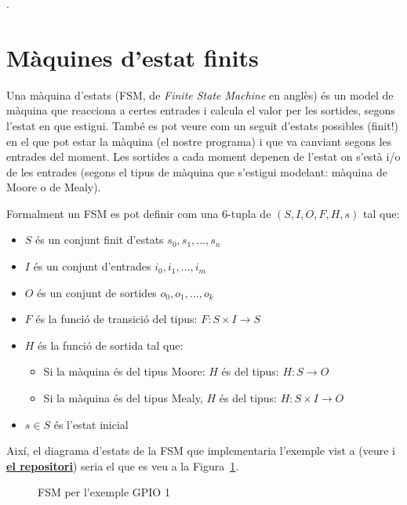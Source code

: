 .

\section{Màquines d'estat finits}
\label{sec:FSM}

Una màquina d'estats (\gls{FSM}, de {\em Finite State Machine} en anglès) és un model de màquina que reacciona a certes entrades i calcula el valor per les sortides, segons l'estat en que estigui. També es pot veure com un seguit d'estats possibles (finit!) en el que pot estar la màquina (el nostre programa) i que va canviant segons les entrades del moment. Les sortides a cada moment depenen de l'estat on s'està i/o de les entrades (segons el tipus de màquina que s'estigui modelant: màquina de Moore o de Mealy).\cite{wiki:FSM}

\begin{remark}
 Formalment un FSM es pot definir com una 6-tupla de $(S, I, O, F, H, s)$ tal que:
\begin{itemize}
 \item $S$ és un conjunt finit d'estats ${s_0,s_1, ..., s_n}$
 \item $I$ és un conjunt d'entrades ${i_0, i_1, ..., i_m}$
 \item $O$ és un conjunt de sortides ${o_0, o_1, ..., o_k}$
 \item $F$ és la funció de transició del tipus: $F: S \times I \to S$
 \item $H$ és la funció de sortida tal que:
 \begin{itemize}
  \item Si la màquina és del tipus Moore: $H$ és del tipus: $H: S \to O$
  \item Si la màquina és del tipus Mealy, $H$ és del tipus: $H: S \times I \to O$ 
 \end{itemize}
 \item $s \in S$ és l'estat inicial 
\end{itemize}
\end{remark}

Així, el diagrama d'estats de la FSM que implementaria l'exemple vist a (veure  i \href{https://github.com/mariusmm/cursembedded/tree/master/Simplicity/GPIO_1}{\bf el repositori}) seria el que es veu a la Figura~\ref{fig:FSM_GPIO1}.

\begin{figure}[h!]
\centering
 \caption{FSM per l'exemple GPIO 1}
 \label{fig:FSM_GPIO1}
\end{figure}

